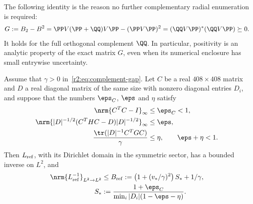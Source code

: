 The following identity is the reason no further complementary radial enumeration is required:
\begin{equation}\label{r2:eq:Gram}
 G:=B_2-B^2
  =\PP V(\PP+\QQ)V\PP-(\PP V\PP)^2
  =(\QQ V\PP)^*(\QQ V\PP)\succeq0.
\end{equation}
It holds for the full orthogonal complement $\QQ$. In particular, positivity is an analytic property of the exact matrix $G$, even when its numerical enclosure has small entrywise uncertainty.

\begin{proposition}\label{r2:prop:Schur}
Assume that $\gamma>0$ in~\eqref{r2:eq:complement-gap}. Let $C$ be a real $408\times408$ matrix and $D$ a real diagonal matrix of the same size with nonzero diagonal entries $D_i$, and suppose that the numbers $\eps_C$, $\eps$ and $\eta$ satisfy
\begin{align}
 \nrm{C^TC-I}_\infty&\le\eps_C<1,\label{r2:eq:C-defect}\\
 \nrm{|D|^{-1/2}(C^THC-D)|D|^{-1/2}}_\infty&\le\eps,\label{r2:eq:H-defect}\\
 \frac{\tr(|D|^{-1}C^TGC)}{\gamma}&\le\eta,
 \qquad\eps+\eta<1.\label{r2:eq:eta}
\end{align}
Then $L_{\rm ref}$, with its Dirichlet domain in the symmetric sector, has a bounded inverse on $L^2$, and
\begin{align}
 \nrm{L_{\rm ref}^{-1}}_{L^2\to L^2}
 &\le B_{\rm ref}:=\left(1+(v_*/\gamma)^2\right)S_*+1/\gamma,
 \label{r2:eq:BLref}\\
 S_*&:=\frac{1+\eps_C}{\min_i|D_i|(1-\eps-\eta)}.\label{r2:eq:S-bound}
\end{align}
\end{proposition}

